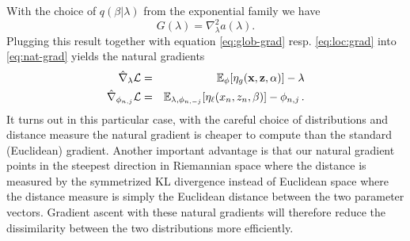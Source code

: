 \documentclass[12pt,abstracton,a4paper]{scrartcl}
\def\x{{\bf x}}
\def\z{{\bf z}}
\begin{document}
With the choice of $q(\beta|\lambda)$ from the exponential family we have 
\begin{equation}
G(\lambda) = \nabla^2_\lambda a(\lambda).
\end{equation}
Plugging this result together with equation \ref{eq:glob-grad} resp. \ref{eq:loc:grad} into \ref{eq:nat-grad} yields the natural gradients
\begin{eqnarray}
\hat\nabla_\lambda \mathcal L &=& 
 \mathbb E_\phi[\eta_g(\x,\z,\alpha)] - \lambda   \\
\hat\nabla_{\phi_{n,j}} \mathcal L &=& 
 \mathbb E_{\lambda,\phi_{n,-j}}[\eta_\ell(x_n,z_n,\beta)] - \phi_{n,j} \, .
\end{eqnarray}
It turns out in this particular case, with the careful choice of distributions and distance measure the natural gradient is cheaper to compute than the standard (Euclidean) gradient. Another important advantage is that our natural gradient points in the steepest direction in Riemannian space where the distance is measured by the symmetrized KL divergence instead of Euclidean space where the distance measure is simply the Euclidean distance between the two parameter vectors. Gradient ascent with these natural gradients will therefore reduce the dissimilarity between the two distributions more efficiently.






\printbibliography
\end{document}
